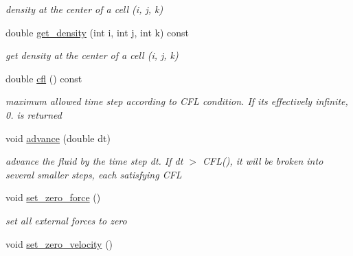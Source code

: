 \begin{DoxyCompactItemize}
\begin{DoxyCompactList}\small\item\em density at the center of a cell (i, j, k) \end{DoxyCompactList}\item 
\hypertarget{class_fluid_sim_a62ea50c5c421145e46209b5e7fa8c66e}{}double \hyperlink{class_fluid_sim_a62ea50c5c421145e46209b5e7fa8c66e}{get\+\_\+density} (int i, int j, int k) const \label{class_fluid_sim_a62ea50c5c421145e46209b5e7fa8c66e}

\begin{DoxyCompactList}\small\item\em get density at the center of a cell (i, j, k) \end{DoxyCompactList}\item 
\hypertarget{class_fluid_sim_a034a2c6014c46db41339b8e8d6832958}{}double \hyperlink{class_fluid_sim_a034a2c6014c46db41339b8e8d6832958}{cfl} () const \label{class_fluid_sim_a034a2c6014c46db41339b8e8d6832958}

\begin{DoxyCompactList}\small\item\em maximum allowed time step according to C\+F\+L condition. If it\textquotesingle{}s effectively infinite, 0. is returned \end{DoxyCompactList}\item 
\hypertarget{class_fluid_sim_a61c83bb89132b4748e353bf90604bafc}{}void \hyperlink{class_fluid_sim_a61c83bb89132b4748e353bf90604bafc}{advance} (double dt)\label{class_fluid_sim_a61c83bb89132b4748e353bf90604bafc}

\begin{DoxyCompactList}\small\item\em advance the fluid by the time step dt. If dt $>$ C\+F\+L(), it will be broken into several smaller steps, each satisfying C\+F\+L \end{DoxyCompactList}\item 
\hypertarget{class_fluid_sim_ad157d29609e7046abfb015f4a69fc207}{}void \hyperlink{class_fluid_sim_ad157d29609e7046abfb015f4a69fc207}{set\+\_\+zero\+\_\+force} ()\label{class_fluid_sim_ad157d29609e7046abfb015f4a69fc207}

\begin{DoxyCompactList}\small\item\em set all external forces to zero \end{DoxyCompactList}\item 
\hypertarget{class_fluid_sim_afd62236b91e338a881475b29de0434de}{}void \hyperlink{class_fluid_sim_afd62236b91e338a881475b29de0434de}{set\+\_\+zero\+\_\+velocity} ()\label{class_fluid_sim_afd62236b91e338a881475b29de0434de}


\end{DoxyCompactItemize}
